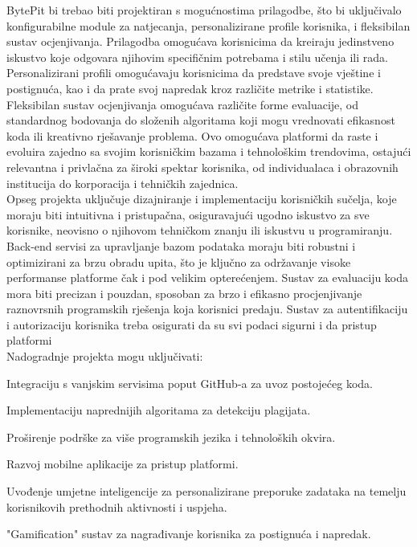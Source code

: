 		BytePit bi trebao biti projektiran s mogućnostima prilagodbe, što bi uključivalo 
		konfigurabilne module za natjecanja, personalizirane profile korisnika, i fleksibilan 
		sustav ocjenjivanja. Prilagodba omogućava korisnicima da kreiraju jedinstveno 
		iskustvo koje odgovara njihovim specifičnim potrebama i stilu učenja ili rada. 
		Personalizirani profili omogućavaju korisnicima da predstave svoje vještine i 
		postignuća, kao i da prate svoj napredak kroz različite metrike i statistike. 
		Fleksibilan sustav ocjenjivanja omogućava različite forme evaluacije, od standardnog 
		bodovanja do složenih algoritama koji mogu vrednovati efikasnost koda ili kreativno 
		rješavanje problema. Ovo omogućava platformi da raste i evoluira zajedno sa svojim 
		korisničkim bazama i tehnološkim trendovima, ostajući relevantna i privlačna za 
		široki spektar korisnika, od individualaca i obrazovnih institucija do korporacija 
		i tehničkih zajednica.
		\\

		Opseg projekta uključuje dizajniranje i implementaciju korisničkih sučelja, koje 
		moraju biti intuitivna i pristupačna, osiguravajući ugodno iskustvo za sve korisnike, 
		neovisno o njihovom tehničkom znanju ili iskustvu u programiranju. Back-end servisi 
		za upravljanje bazom podataka moraju biti robustni i optimizirani za brzu obradu 
		upita, što je ključno za održavanje visoke performanse platforme čak i pod velikim 
		opterećenjem. Sustav za evaluaciju koda mora biti precizan i pouzdan, sposoban za 
		brzo i efikasno procjenjivanje raznovrsnih programskih rješenja koja korisnici 
		predaju. Sustav za autentifikaciju i autorizaciju korisnika treba osigurati da su 
		svi podaci sigurni i da pristup platformi
		\\

		Nadogradnje projekta mogu uključivati:
		\begin{packed_item}
			\item Integraciju s vanjskim servisima poput GitHub-a za uvoz postojećeg koda.
			\item Implementaciju naprednijih algoritama za detekciju plagijata.
			\item Proširenje podrške za više programskih jezika i tehnoloških okvira.
			\item Razvoj mobilne aplikacije za pristup platformi.
			\item Uvođenje umjetne inteligencije za personalizirane preporuke zadataka
			na temelju korisnikovih prethodnih aktivnosti i uspjeha.
			\item "Gamification" sustav za nagrađivanje korisnika za postignuća i napredak.
		\end{packed_item}


		\eject
		
		
	
